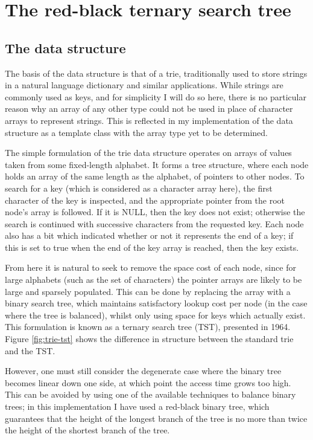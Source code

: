 \documentclass[a4paper,12pt,twoside,openright]{report}
\begin{document}
	\section{The red-black ternary search tree}
	\label{sec:TST-impl}
	
	\subsection{The data structure}
	
	The basis of the data structure is that of a trie, traditionally used to store strings in a natural language dictionary and similar applications. While strings are commonly used as keys, and for simplicity I will do so here, there is no particular reason why an array of any other type could not be used in place of character arrays to represent strings. This is reflected in my implementation of the data structure as a template class with the array type yet to be determined.
	
	The simple formulation of the trie data structure operates on arrays of values taken from some fixed-length alphabet. It forms a tree structure, where each node holds an array of the same length as the alphabet, of pointers to other nodes. To search for a key (which is considered as a character array here), the first character of the key is inspected, and the appropriate pointer from the root node's array is followed. If it is NULL, then the key does not exist; otherwise the search is continued with successive characters from the requested key. Each node also has a bit which indicated whether or not it represents the end of a key; if this is set to true when the end of the key array is reached, then the key exists.
	
	From here it is natural to seek to remove the space cost of each node, since for large alphabets (such as the set of characters) the pointer arrays are likely to be large and sparsely populated. This can be done by replacing the array with a binary search tree, which maintains satisfactory lookup cost per node (in the case where the tree is balanced), whilst only using space for keys which actually exist. This formulation is known as a ternary search tree (TST), presented in 1964\cite{Clampett-ternary}. Figure \ref{fig:trie-tst} shows the difference in structure between the standard trie and the TST.
	
	However, one must still consider the degenerate case where the binary tree becomes linear down one side, at which point the access time grows too high. This can be avoided by using one of the available techniques to balance binary trees; in this implementation I have used a red-black binary tree, which guarantees that the height of the longest branch of the tree is no more than twice the height of the shortest branch of the tree.
	
\end{document}
